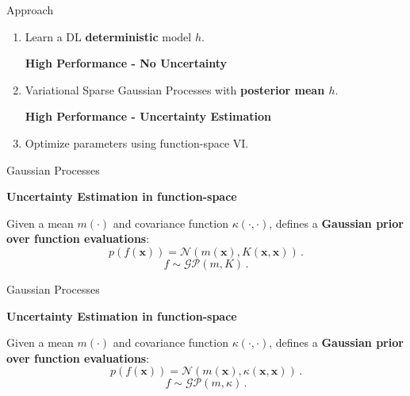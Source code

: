 \documentclass[aspectratio=149]{beamer}
\newcommand{\h}[1]{\color{orange}\textbf{#1}}
\begin{document}
    \begin{frame}{Approach}

        \begin{enumerate}[<+->]
            \item Learn a DL \textbf{deterministic} model \(h\).
            \begin{center}
                \h{High Performance - No Uncertainty}
            \end{center}
            \item  Variational Sparse Gaussian Processes with \textbf{posterior mean \(h\)}.
            \begin{center}
                \h{High Performance - Uncertainty Estimation}
            \end{center}
            \item Optimize parameters using function-space VI.
        \end{enumerate}

    \end{frame}
        \begin{frame}{Gaussian Processes}
        \begin{center}\color{orange}
            \textbf{Uncertainty Estimation in function-space}
        \end{center}
        {\color{shadecolor}
        Given a mean \(m(\cdot)\) and covariance function \(\kappa(\cdot, \cdot)\), defines a \textbf{Gaussian prior over function evaluations}:
        \[
        p(f(\mathbf{x})) = \mathcal{N}(m(\mathbf{x}), K(\mathbf{x}, \mathbf{x}))\,.
        \]
        \[
        f \sim \mathcal{G}\mathcal{P}(m, K)\,.
        \]
        }
    \end{frame}
    \begin{frame}{Gaussian Processes}
        \begin{center}\color{shadecolor}\textbf{Uncertainty Estimation in function-space}
        \end{center}
        {\color{black}
        Given a mean \(m(\cdot)\) and covariance function \(\kappa(\cdot, \cdot)\), defines a {\color{orange}\textbf{Gaussian prior over function evaluations}}:
        \[
        p(f(\mathbf{x})) = \mathcal{N}(m(\mathbf{x}), \kappa(\mathbf{x}, \mathbf{x}))\,.
        \]
        \[
        f \sim \mathcal{G}\mathcal{P}(m, \kappa)\,.
        \]
        }
    \end{frame}
\end{document}
